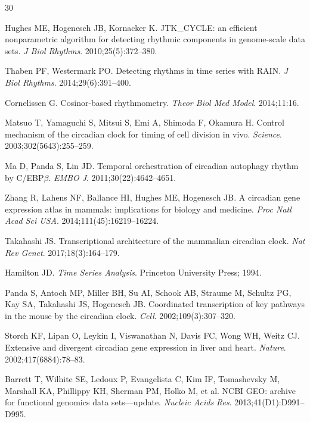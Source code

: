 \documentclass[11pt,letterpaper]{article}
\begin{document}

\begin{thebibliography}{30}

Hughes ME, Hogenesch JB, Kornacker K.
JTK\_CYCLE: an efficient nonparametric algorithm for detecting rhythmic components in genome-scale data sets.
\textit{J Biol Rhythms}. 2010;25(5):372--380.

Thaben PF, Westermark PO.
Detecting rhythms in time series with RAIN.
\textit{J Biol Rhythms}. 2014;29(6):391--400.

Cornelissen G.
Cosinor-based rhythmometry.
\textit{Theor Biol Med Model}. 2014;11:16.

Matsuo T, Yamaguchi S, Mitsui S, Emi A, Shimoda F, Okamura H.
Control mechanism of the circadian clock for timing of cell division in vivo.
\textit{Science}. 2003;302(5643):255--259.

Ma D, Panda S, Lin JD.
Temporal orchestration of circadian autophagy rhythm by C/EBP$\beta$.
\textit{EMBO J}. 2011;30(22):4642--4651.

Zhang R, Lahens NF, Ballance HI, Hughes ME, Hogenesch JB.
A circadian gene expression atlas in mammals: implications for biology and medicine.
\textit{Proc Natl Acad Sci USA}. 2014;111(45):16219--16224.

Takahashi JS.
Transcriptional architecture of the mammalian circadian clock.
\textit{Nat Rev Genet}. 2017;18(3):164--179.

Hamilton JD.
\textit{Time Series Analysis}.
Princeton University Press; 1994.

Panda S, Antoch MP, Miller BH, Su AI, Schook AB, Straume M, Schultz PG, Kay SA, Takahashi JS, Hogenesch JB.
Coordinated transcription of key pathways in the mouse by the circadian clock.
\textit{Cell}. 2002;109(3):307--320.

Storch KF, Lipan O, Leykin I, Viswanathan N, Davis FC, Wong WH, Weitz CJ.
Extensive and divergent circadian gene expression in liver and heart.
\textit{Nature}. 2002;417(6884):78--83.

Barrett T, Wilhite SE, Ledoux P, Evangelista C, Kim IF, Tomashevsky M, Marshall KA, Phillippy KH, Sherman PM, Holko M, et al.
NCBI GEO: archive for functional genomics data sets---update.
\textit{Nucleic Acids Res}. 2013;41(D1):D991--D995.


\end{thebibliography}
\end{document}
